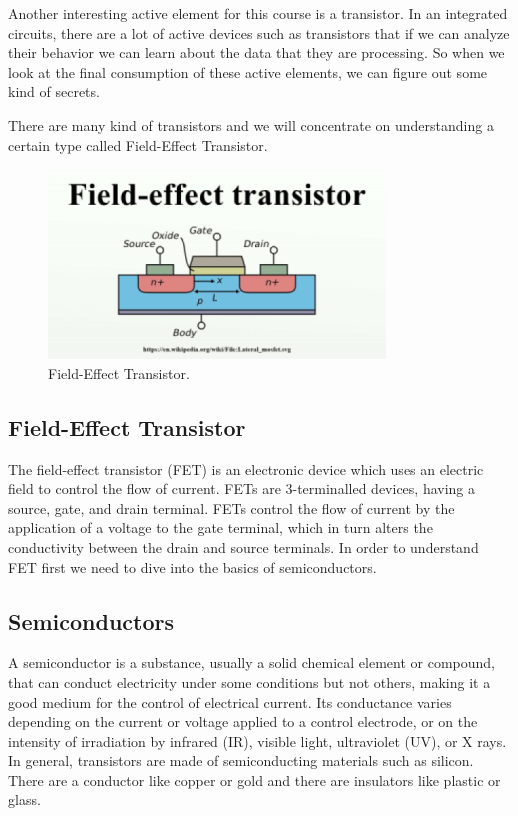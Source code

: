 Another interesting active element for this course is a transistor. In an
integrated circuits, there are a lot of active devices such as transistors  that
if we can analyze their behavior we can learn about the data that they are
processing. So when we look at the final consumption of these active elements,
we can figure out some kind of secrets.

There are many kind of transistors and we will concentrate on understanding a
certain type called Field-Effect Transistor.

\begin{figure}[!ht]
	\centering
	\includegraphics{images/field_effect_transistor.png}
	\caption{Field-Effect Transistor.} \label{fig:field_effect_transistor}
\end{figure}

\subsection{Field-Effect Transistor}

The field-effect transistor (FET) is an electronic device which uses an electric
field to control the flow of current. FETs are 3-terminalled devices, having a
source, gate, and drain terminal. FETs control the flow of current by the
application of a voltage to the gate terminal, which in turn alters the
conductivity between the drain and source terminals. In order to understand FET
first we need to dive into the basics of semiconductors.

\subsection{Semiconductors}

A semiconductor is a substance, usually a solid chemical element or compound,
that can conduct electricity under some conditions but not others, making it a
good medium for the control of electrical current. Its conductance varies
depending on the current or voltage applied to a control electrode, or on the
intensity of irradiation by infrared (IR), visible light, ultraviolet (UV), or X
rays. In general, transistors are made of semiconducting materials such as
silicon. There are a conductor like copper or gold and there are insulators like
plastic or glass.

